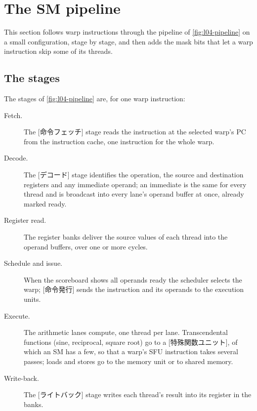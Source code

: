\documentclass[../main.tex]{subfiles}
\begin{document}
\section{The SM pipeline}
\label{sec:l04-pipeline}

This section follows warp instructions through the pipeline of
\cref{fig:l04-pipeline} on a small configuration, stage by stage, and
then adds the mask bits that let a warp instruction skip some of its
threads.

\subsection{The stages}

The stages of \cref{fig:l04-pipeline} are, for one warp instruction:
\begin{description}
  \item[Fetch.]  The [命令フェッチ] stage reads the
    instruction at the selected warp's PC from the instruction cache,
    one instruction for the whole warp.
  \item[Decode.]  The [デコード] stage identifies the operation, the
    source and destination registers and any immediate operand; an
    immediate is the same for every thread and is broadcast into every
    lane's operand buffer at once, already marked ready.
  \item[Register read.]  The register banks deliver the source values of
    each thread into the operand buffers, over one or more cycles.
  \item[Schedule and issue.]  When the scoreboard shows all operands
    ready the scheduler selects the warp; [命令発行] sends
    the instruction and its operands to the execution units.
  \item[Execute.]  The arithmetic lanes compute, one thread per lane.
    Transcendental functions (sine, reciprocal, square root) go to a
    [特殊関数ユニット], of which an SM
    has a few, so that a warp's SFU instruction takes several passes;
    loads and stores go to the memory unit or to shared
    memory.
  \item[Write-back.]  The [ライトバック] stage writes each
    thread's result into its register in the banks.
\end{description}
\end{document}
